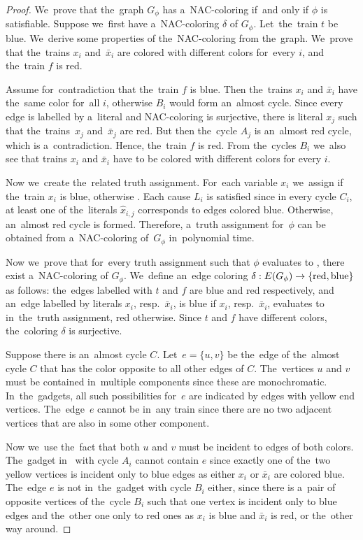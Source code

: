\begin{proof}
	We~prove that the~graph $G_\phi$ has a~NAC-coloring if~and only if
	$\phi$ is satisfiable.
	Suppose we~first have a~NAC-coloring $\delta$ of $G_\phi$.
	Let~the~train $t$ be blue.
	We~derive some properties of the~NAC-coloring from the~graph.
	We~prove that the~trains $x_i$ and~$\bar{x}_i$
	are colored with different colors for~every $i$,
	and the~train $f$ is red.

	Assume for~contradiction that the~train $f$ is blue.
	Then the~trains $x_i$ and $\bar{x}_i$ have the~same color for~all $i$,
	otherwise $B_i$ would form an~almost cycle.
	Since every edge is labelled by a~literal and NAC-coloring is surjective,
	there is literal $x_j$ such that the~trains~$x_j$ and~$\bar{x}_j$ are red.
	But then the~cycle $A_j$ is an~almost red cycle, which is a~contradiction.
	Hence, the~train $f$ is red.
	From the~cycles $B_i$ we~also see
	that trains $x_i$ and $\bar{x}_i$ have to be colored with different colors
	for every $i$.

	Now we~create the~related truth assignment.
	For~each variable $x_i$ we~assign \true{} if
	the~train $x_i$ is blue,
	otherwise \false{}.
	Each cause $L_i$ is satisfied since
	in every cycle $C_i$, at least one of
	the~literals $\hat{x}_{i,j}$ corresponds to edges colored blue.
	Otherwise, an~almost red cycle is formed.
	Therefore, a~truth assignment for~$\phi$ can be obtained
	from a~NAC-coloring of~$G_\phi$ in~polynomial time.

	Now we~prove that for~every truth assignment such that $\phi$ evaluates to \true{}, there exist
	a~NAC-coloring of $G_\phi$. We~define an~edge coloring
	$\delta: E(G_\phi) \to \{\text{red}, \text{blue}\}$ as follows:
	the~edges labelled with $t$ and $f$ are blue and red respectively,
	and an~edge labelled by literals $x_i$, resp.\ $\bar{x}_i$, is blue
	if $x_i$, resp.\ $\bar{x}_i$, evaluates to \true{} in~the~truth assignment, red otherwise.
	Since $t$ and $f$ have different colors,
	the~coloring $\delta$ is surjective.

	Suppose there is an~almost cycle $C$.
	Let~$e=\{u, v\}$ be the~edge of the~almost cycle $C$ that has the color opposite
	to all other edges of $C$.
	The~vertices $u$ and $v$ must be contained in~multiple \trcon{} components
	since these are monochromatic.
	In~the~gadgets, all such possibilities for~$e$ are indicated by edges with yellow end vertices.
	The~edge~$e$ cannot be in~any train since there are no two adjacent vertices that are also
	in some other \trcon{} component.

	Now we~use the~fact that both $u$ and $v$ must be incident to edges of both colors.
	The~gadget in~ with cycle $A_i$
	cannot contain $e$ since exactly one of the~two yellow vertices is incident only to blue edges
	as either $x_i$ or $\bar{x}_i$ are colored blue.
	The~edge $e$ is not in~the~gadget with cycle $B_i$ either,
	since there is a~pair of opposite vertices of the~cycle $B_i$
	such that one vertex is incident only to blue edges and the~other one only to red ones
	as $x_i$ is blue and $\bar{x}_i$ is red, or the~other way around.


\end{proof}
